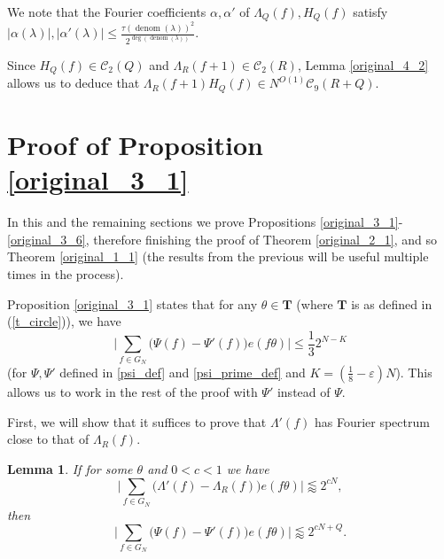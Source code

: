 \documentclass[11pt, reqno]{amsart}
\newtheorem{lemma}[theorem]{Lemma}
\numberwithin{equation}{section}
\newcommand\eps{\varepsilon}
\newcommand\denom{\operatorname{denom}}
\begin{document}
We note that the Fourier coefficients $\alpha, \alpha'$ of $\Lambda_Q(f), H_Q(f)$ satisfy $|\alpha(\lambda)|, |\alpha'(\lambda)| \leqslant \frac{\tau(\denom(\lambda))^2}{2^{\deg( \denom(\lambda) )}}$.

Since $H_Q(f) \in \mathcal{C}_2(Q)$ and $\Lambda_R(f+1) \in \mathcal{C}_2(R)$, Lemma \ref{original_4_2} allows us to deduce that $\Lambda_R(f+1)H_Q(f) \in N^{O(1)} \mathcal{C}_9(R+Q)$.

\section{Proof of Proposition \ref{original_3_1}}
\label{section_3_1}
In this and the remaining sections we prove Propositions \ref{original_3_1}-\ref{original_3_6}, therefore finishing the proof of Theorem \ref{original_2_1}, and so Theorem \ref{original_1_1} (the results from the previous will be useful multiple times in the process).

Proposition \ref{original_3_1} states that for any $\theta \in \mathbf{T}$ (where $\mathbf{T}$ is as defined in (\ref{t_circle})), we have $$\bigg| \sum_{f \in G_N} \big( \Psi(f) - \Psi'(f) \big) e(f\theta) \bigg| \leqslant \frac{1}{3}2^{N-K}$$
(for $\Psi, \Psi'$ defined in \ref{psi_def} and \ref{psi_prime_def} and $K=(\frac{1}{8}-\eps)N$). This allows us to work in the rest of the proof with $\Psi'$ instead of $\Psi$.

First, we will show that it suffices to prove that $\Lambda'(f)$ has Fourier spectrum close to that of $\Lambda_R(f)$.

\begin{lemma}
    If for some $\theta$ and $0<c<1$ we have
    $$\bigg| \sum_{f \in G_N} \big( \Lambda'(f) - \Lambda_R(f) \big) e(f \theta) \bigg| \lessapprox 2^{cN},$$ then $$\bigg| \sum_{f \in G_N} \big( \Psi(f) - \Psi'(f) \big) e(f \theta)\bigg| \lessapprox 2^{cN+Q}.$$
\end{lemma}
\end{document}
